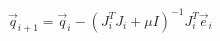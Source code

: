 \documentclass[border=5pt]{standalone}
\begin{document}
$\vec{q}_{i+1} = \vec{q}_i-(J_i^TJ_i+\mu I)^{-1}J_i^T\vec{e}_i$
\end{document}
